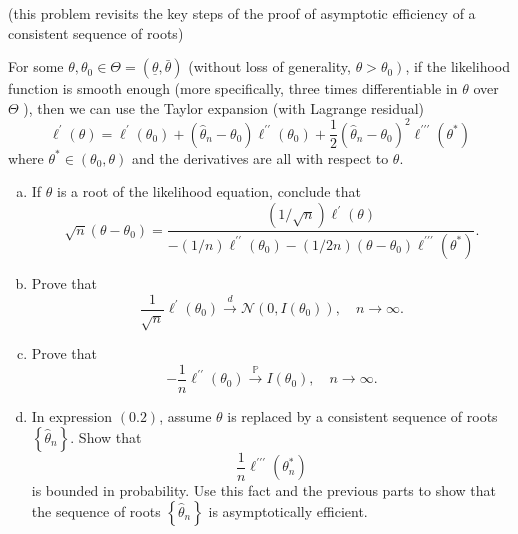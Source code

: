 \begin{ex}
    (this problem revisits the key steps of the proof of asymptotic efficiency of a consistent sequence of roots)

    For some \(\theta, \theta_{0} \in \Theta=(\underline{\theta}, \bar{\theta})\) (without loss of generality, \(\left.\theta>\theta_{0}\right)\), if the likelihood function is smooth enough (more specifically, three times differentiable in \(\theta\) over \(\Theta\) ), then we can use the Taylor expansion (with Lagrange residual)
    \[
    \ell^{\prime}(\theta)=\ell^{\prime}\left(\theta_{0}\right)+\left(\widehat{\theta}_{n}-\theta_{0}\right) \ell^{\prime \prime}\left(\theta_{0}\right)+\frac{1}{2}\left(\widehat{\theta}_{n}-\theta_{0}\right)^{2} \ell^{\prime \prime \prime}\left(\theta^{*}\right)
    \]
    where \(\theta^{*} \in\left(\theta_{0}, \theta\right)\) and the derivatives are all with respect to \(\theta\). 
    \begin{enumerate}[(a)]
        \item If \(\theta\) is a root of the likelihood equation, conclude that
        \[
            \sqrt{n}\left(\theta-\theta_{0}\right)=\frac{(1 / \sqrt{n}) \ell^{\prime}(\theta)}{-(1 / n) \ell^{\prime \prime}\left(\theta_{0}\right)-(1 / 2 n)\left(\theta-\theta_{0}\right) \ell^{\prime \prime \prime}\left(\theta^{*}\right)}. 
        \]
        \item  Prove that
        \[
            \frac{1}{\sqrt{n}} \ell^{\prime}\left(\theta_{0}\right) \stackrel{d}{\rightarrow} \mathcal{N}\left(0, I\left(\theta_{0}\right)\right), \quad n \rightarrow \infty. 
        \]
        \item Prove that
        \[
            -\frac{1}{n} \ell^{\prime \prime}\left(\theta_{0}\right) \stackrel{\mathbb{P}}{\rightarrow} I\left(\theta_{0}\right), \quad n \rightarrow \infty. 
        \]
        \item In expression \((0.2)\), assume \(\theta\) is replaced by a consistent sequence of roots \(\left\{\hat{\theta}_{n}\right\}\). Show that
        \[
        \frac{1}{n} \ell^{\prime \prime \prime}\left(\theta_{n}^{*}\right)
        \]
        is bounded in probability. Use this fact and the previous parts to show that the sequence of roots \(\left\{\widehat{\theta}_{n}\right\}\) is asymptotically efficient. 
    \end{enumerate}
\end{ex}

